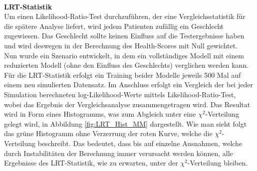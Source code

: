\documentclass[%
thesis=student,%
coverpage=false,%
titlepage=false,%
headmarks=true, %
german,%
font=libertine, %
math=newpxtx, %
BCOR=5mm,%
coverBCOR=11mm%
]{tumbook}
\theoremstyle{break}
\begin{document}
\begin{table}[h]
	\centering
	\caption{Einfluss und Erstellung der Parameter des Health-Scores}
	\label{tab:health_score_parameters}
\end{table}
\\
\textbf{LRT-Statistik}\\
Um einen Likelihood-Ratio-Test durchzuführen, der eine Vergleichsstatistik für die spätere Analyse liefert, wird jedem Patienten zufällig ein Geschlecht zugewiesen. Das Geschlecht sollte keinen Einfluss auf die Testergebnisse haben und wird deswegen in der Berechnung des Health-Scores mit Null gewichtet. \\
Nun wurde ein Szenario entwickelt, in dem ein vollständiges Modell mit einem reduzierten Modell (ohne den Einfluss des Geschlechts) verglichen werden kann. Für die LRT-Statistik erfolgt ein Training beider Modelle jeweils 500 Mal auf einem neu simulierten Datensatz. Im Anschluss erfolgt ein Vergleich der bei jeder Simulation berechneten log-Likelihood-Werte mittels Likelihood-Ratio-Test, wobei das Ergebnis der Vergleichsanalyse zusammengetragen wird. Das Resultat wird in Form eines Histogramms, was zum Abgleich unter eine $\chi^2$-Verteilung gelegt wird, in Abbildung \ref{fig:LRT_Hist_MM} dargestellt. Wie man sieht folgt das grüne Histogramm ohne Verzerrung der roten Kurve, welche die $\chi^2$-Verteilung beschreibt. Das bedeutet, dass bis auf einzelne Ausnahmen, welche durch Instabilitäten der Berechnung immer verursacht werden können, alle Ergebnisse des LRT-Statistik, wie zu erwarten, unter der $\chi^2$-Verteilung bleiben.
\end{document}
